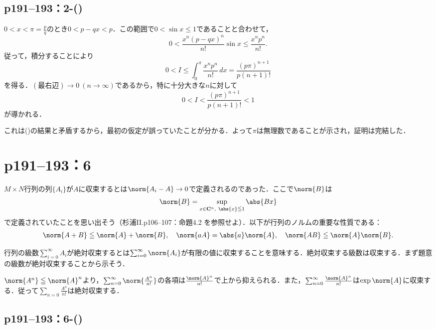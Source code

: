 \subsection*{p191--193：2-()}

\begin{tproof}
    $0 < x < \pi = \frac{p}{q}$のとき$0 < p - qx < p$．この範囲で$0 < \sin x \leq 1$であることと合わせて，
    \[
        0 < \frac{x^n(p - qx)^n}{n!}\sin x \leq \frac{x^np^n}{n!}.
    \]
    従って，積分することにより
    \[
        0 < I \leq \int_{0}^{\pi} \frac{x^np^n}{n!}\, dx = \frac{(p\pi)^{n+1}}{p(n+1)!}
    \]
    を得る．$(\text{最右辺}) \to 0\ (n \to \infty)$であるから，特に十分大きな$n$に対して
    \[
        0 < I < \frac{(p\pi)^{n+1}}{p(n+1)!} < 1
    \]
    が導かれる．

    これは()の結果と矛盾するから，最初の仮定が誤っていたことが分かる．よって$\pi$は無理数であることが示され，証明は完結した．
\end{tproof}


\section*{p191--193：6}

$M \times N$行列の列$\{A_i\}$が$A$に収束するとは$\norm{A_i - A} \to 0$で定義されるのであった．ここで$\norm{B}$は
\[
    \norm{B} = \sup_{x \in \mathbf{C}^n,\ \abs{x} \leqq 1}\abs{Bx}
\]
で定義されていたことを思い出そう（杉浦II.p106--107：命題4.2 を参照せよ）．以下が行列のノルムの重要な性質である：
\[
    \norm{A + B} \leq \norm{A} + \norm{B}, \quad \norm{aA} = \abs{a}\norm{A}, \quad \norm{AB} \leq \norm{A}\norm{B}.
\]

行列の級数$\sum_{i=0}^\infty A_i$が絶対収束するとは$\sum_{i=0}^\infty \norm{A_i}$が有限の値に収束することを意味する．絶対収束する級数は収束する．まず題意の級数が絶対収束することから示そう．

\begin{tproof}
    $\norm{A^n} \leq \norm{A}^n$より，$\sum_{n = 0}^\infty \norm{\frac{A^n}{n!}}$の各項は$\frac{\norm{A}^n}{n!}$で上から抑えられる．また，$\sum_{n=0}^\infty \frac{\norm{A}^n}{n!}$は$\exp \norm{A}$に収束する．従って$\sum_{n = 0} \frac{A^n}{n!}$は絶対収束する．
\end{tproof}


\subsection*{p191--193：6-()}

